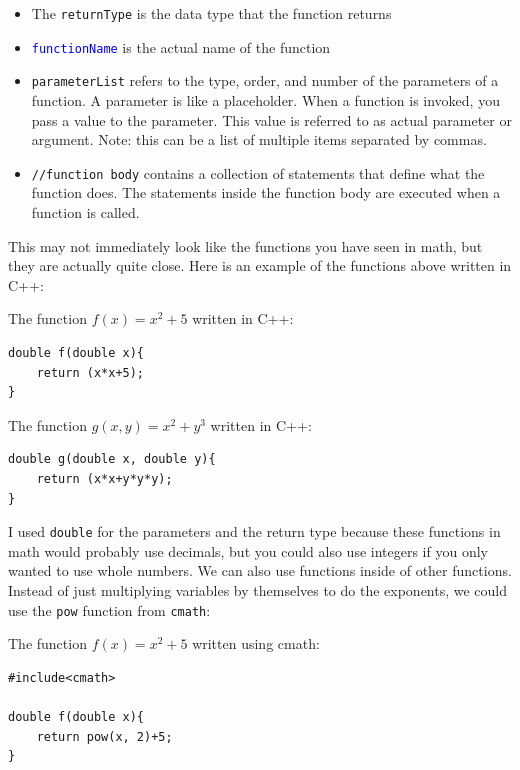 \begin{itemize}
    \item The \texttt{returnType} is the data type that the function returns
    \item \textcolor{blue}{\texttt{functionName}} is the actual name of the function
    \item \texttt{parameterList} refers to the type, order, and number of the parameters of a function. A parameter is like a placeholder. When a function is invoked, you pass a value to the parameter. This value is referred to as actual parameter or argument. Note: this can be a list of multiple items separated by commas. 
    \item \texttt{//function body} contains a collection of statements that define what the function does. The statements inside the function body are executed when a function is called.
\end{itemize}

This may not immediately look like the functions you have seen in math, but they are actually quite close. Here is an example of the functions above written in C++:

\begin{example}
    The function $f(x) = x^2 + 5$ written in C++:

    \begin{verbatim}
double f(double x){
    return (x*x+5);
}
    \end{verbatim}
\end{example}

\begin{example}
    The function $g(x,y) = x^2+y^3$ written in C++:

    \begin{verbatim}
double g(double x, double y){
    return (x*x+y*y*y);
} 
    \end{verbatim}
\end{example}

I used \texttt{double} for the parameters and the return type because these functions in math would probably use decimals, but you could also use integers if you only wanted to use whole numbers. We can also use functions inside of other functions. Instead of just multiplying variables by themselves to do the exponents, we could use the \texttt{pow} function from \texttt{cmath}:

\begin{example}
    The function $f(x) = x^2 + 5$ written using cmath:

    \begin{verbatim}
#include<cmath>

double f(double x){
    return pow(x, 2)+5;
}
    \end{verbatim}
\end{example}

